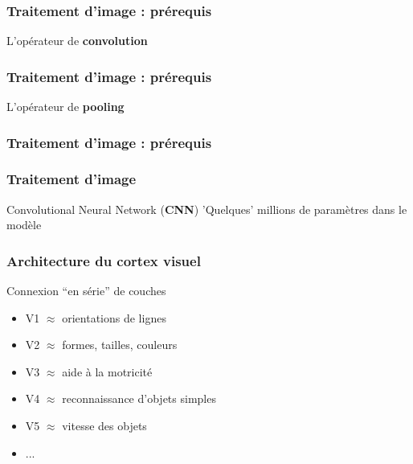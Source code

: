 \begin{frame}
  \frametitle{Traitement d'image : prérequis}
  L'opérateur de \textbf{convolution}
\end{frame}

\begin{frame}
  \frametitle{Traitement d'image : prérequis}
  L'opérateur de \textbf{pooling}
\end{frame}

\begin{frame}
  \frametitle{Traitement d'image : prérequis}
\end{frame}

\begin{frame}
  \frametitle{Traitement d'image}
  Convolutional Neural Network (\textbf{CNN})
  'Quelques' millions de paramètres dans le modèle
\end{frame}

\begin{frame}
  \frametitle{Architecture du cortex visuel}
  \begin{minipage}[l]{0.55\linewidth}
  \end{minipage}\hfill
  \begin{minipage}[l]{0.44\linewidth}
    Connexion ``en série'' de couches
    \begin{itemize}
    \item V1 $\approx$ orientations de lignes
    \item V2 $\approx$ formes, tailles, couleurs
    \item V3 $\approx$ aide à la motricité
    \item V4 $\approx$ reconnaissance d'objets simples
    \item V5 $\approx$ vitesse des objets
    \item ...
    \end{itemize}
  \end{minipage}\hfill
\end{frame}
